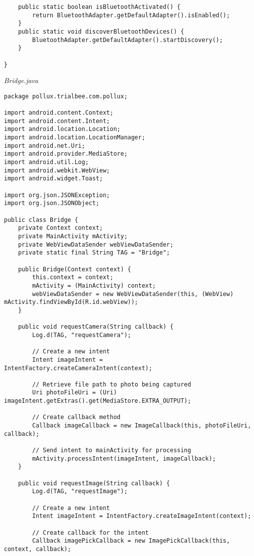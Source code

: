 \begin{appendices}
\begin{lstlisting}
    public static boolean isBluetoothActivated() {
        return BluetoothAdapter.getDefaultAdapter().isEnabled();
    }
    public static void discoverBluetoothDevices() {
        BluetoothAdapter.getDefaultAdapter().startDiscovery();
    }

}
\end{lstlisting}
\emph{Bridge.java}
\begin{lstlisting}
package pollux.trialbee.com.pollux;

import android.content.Context;
import android.content.Intent;
import android.location.Location;
import android.location.LocationManager;
import android.net.Uri;
import android.provider.MediaStore;
import android.util.Log;
import android.webkit.WebView;
import android.widget.Toast;

import org.json.JSONException;
import org.json.JSONObject;

public class Bridge {
    private Context context;
    private MainActivity mActivity;
    private WebViewDataSender webViewDataSender;
    private static final String TAG = "Bridge";

    public Bridge(Context context) {
        this.context = context;
        mActivity = (MainActivity) context;
        webViewDataSender = new WebViewDataSender(this, (WebView) mActivity.findViewById(R.id.webView));
    }

    public void requestCamera(String callback) {
        Log.d(TAG, "requestCamera");

        // Create a new intent
        Intent imageIntent = IntentFactory.createCameraIntent(context);

        // Retrieve file path to photo being captured
        Uri photoFileUri = (Uri) imageIntent.getExtras().get(MediaStore.EXTRA_OUTPUT);

        // Create callback method
        Callback imageCallback = new ImageCallback(this, photoFileUri, callback);

        // Send intent to mainActivity for processing
        mActivity.processIntent(imageIntent, imageCallback);
    }

    public void requestImage(String callback) {
        Log.d(TAG, "requestImage");

        // Create a new intent
        Intent imageIntent = IntentFactory.createImageIntent(context);

        // Create callback for the intent
        Callback imagePickCallback = new ImagePickCallback(this, context, callback);


\end{lstlisting}
\end{appendices}
